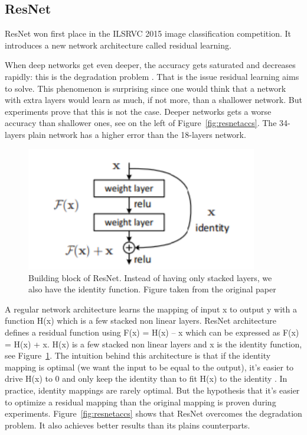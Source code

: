 \subsection{ResNet}
ResNet won first place in the ILSRVC 2015 image classification competition. It introduces a new network architecture called residual learning. 

When deep networks get even deeper, the accuracy gets saturated and decreases rapidly: this is the degradation problem \cite{resnetpaper}. That is the issue residual learning aims to solve. This phenomenon is surprising since one would think that a network with extra layers would learn as much, if not more, than a shallower network. But experiments prove that this is not the case. Deeper networks gets a worse accuracy than shallower ones, see on the left of Figure~\ref{fig:resnetaccs}. The 34-layers plain network has a higher error than the 18-layers network. 

\begin{figure}[!htp]
    \centering
        \includegraphics[width=0.9\textwidth]{figures/02-resnet_block}
        \caption[Building block of ResNet]{Building block of ResNet. Instead of having only stacked layers, we also have the identity function. Figure taken from the original paper \cite{resnetpaper}}\label{fig:resnetblock}
\end{figure}
A regular network architecture learns the mapping of input x to output y with a function H(x) which is a few stacked non linear layers. ResNet architecture defines a residual function using F(x) = H(x) – x which can be expressed as F(x) = H(x) + x. H(x) is a few stacked non linear layers and x is the identity function, see Figure~\ref{fig:resnetblock}. The intuition behind this architecture is that if the identity mapping is optimal (we want the input to be equal to the output), it’s easier to drive H(x) to 0 and only keep the identity than to fit H(x) to the identity \cite{mediumresnet}. In practice, identity mappings are rarely optimal. But the hypothesis that it’s easier to optimize a residual mapping  than the original mapping is proven during experiments. Figure~\ref{fig:resnetaccs} shows that ResNet overcomes the degradation problem. It also achieves better results than its plains counterparts.


